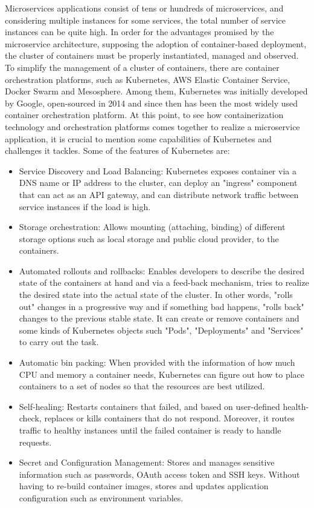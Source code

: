 \documentclass{Configuration_Files/PoliMi3i_thesis}
\begin{document}
Microservices applications consist of tens or hundreds of microservices, and considering multiple instances for some services, the total number of service instances can be quite high.
In order for the advantages promised by the microservice architecture, supposing the adoption of container-based deployment, the cluster of containers must be properly instantiated, managed and observed.
To simplify the management of a cluster of containers, there are container orchestration platforms, such as Kubernetes, AWS Elastic Container Service, Docker Swarm and Mesosphere.
Among them, Kubernetes was initially developed by Google, open-sourced in 2014 and since then has been the most widely used container orchestration platform.
At this point, to see how containerization technology and orchestration platforms comes together to realize a microservice application, it is crucial to mention some capabilities of Kubernetes and challenges it tackles.
Some of the features of Kubernetes are:
\begin{itemize}
    \item Service Discovery and Load Balancing: Kubernetes exposes container via a DNS name or IP address to the cluster, can deploy an "ingress" component that can act as an API gateway, and can distribute network traffic between service instances if the load is high.
    
    \item Storage orchestration: Allows mounting (attaching, binding) of different storage options such as local storage and public cloud provider, to the containers.
    
    \item Automated rollouts and rollbacks: Enables developers to describe the desired state of the containers at hand and via a feed-back mechanism, tries to realize the desired state into the actual state of the cluster. In other words, "rolls out" changes in a progressive way and if something bad happens, "rolls back" changes to the previous stable state. It can create or remove containers and some kinds of Kubernetes objects such "Pods", "Deployments" and "Services" to carry out the task.
    
    \item Automatic bin packing: When provided with the information of how much CPU and memory a container needs, Kubernetes can figure out how to place containers to a set of nodes so that the resources are best utilized.
    
    \item Self-healing: Restarts containers that failed, and based on user-defined health-check, replaces or kills containers that do not respond. Moreover, it routes traffic to healthy instances until the failed container is ready to handle requests.
    
    \item Secret and Configuration Management: Stores and manages sensitive information such as passwords, OAuth access token and SSH keys. Without having to re-build container images, stores and updates application configuration such as environment variables.
\end{itemize}
\end{document}
